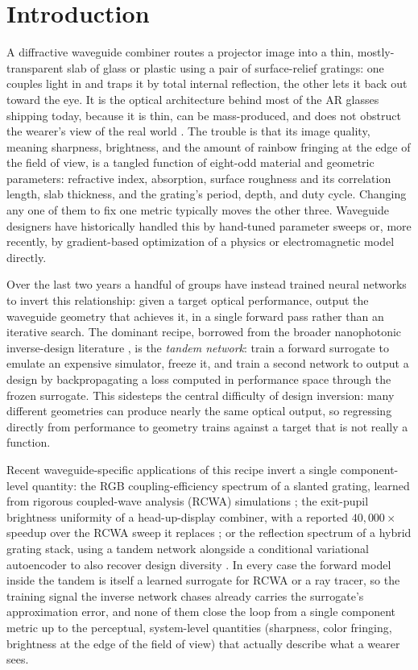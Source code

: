 \documentclass[10pt,twocolumn]{article}
\begin{document}
\section{Introduction}

A diffractive waveguide combiner routes a projector image into a thin,
mostly-transparent slab of glass or plastic using a pair of surface-relief
gratings: one couples light in and traps it by total internal reflection,
the other lets it back out toward the eye. It is the optical architecture
behind most of the AR glasses shipping today, because it is thin, can be
mass-produced, and does not obstruct the wearer's view of the real world
\cite{kress2021}. The trouble is that its image quality, meaning
sharpness, brightness, and the amount of rainbow fringing at the edge of
the field of view, is a tangled function of eight-odd
material and geometric parameters: refractive index, absorption, surface
roughness and its correlation length, slab thickness, and the grating's
period, depth, and duty cycle. Changing any one of them to fix one metric
typically moves the other three. Waveguide designers have historically
handled this by hand-tuned parameter sweeps or, more recently, by
gradient-based optimization of a physics or electromagnetic model directly.

Over the last two years a handful of groups have instead trained neural
networks to invert this relationship: given a target optical performance,
output the waveguide geometry that achieves it, in a single forward pass
rather than an iterative search. The dominant recipe, borrowed from the
broader nanophotonic inverse-design literature \cite{liu2018,peurifoy2018,
ma2021}, is the \emph{tandem network}: train a forward surrogate to emulate
an expensive simulator, freeze it, and train a second network to output a
design by backpropagating a loss computed in performance space through the
frozen surrogate. This sidesteps the central difficulty of design inversion:
many different geometries can produce nearly the same
optical output, so regressing directly from performance to geometry trains
against a target that is not really a function.

Recent waveguide-specific applications of this recipe invert a single
component-level quantity: the RGB coupling-efficiency spectrum of a slanted
grating, learned from rigorous coupled-wave analysis (RCWA) simulations
\cite{luo2024}; the exit-pupil brightness uniformity of a head-up-display
combiner, with a reported $40{,}000\times$ speedup over the RCWA sweep it
replaces \cite{dai2025}; or the reflection spectrum of a hybrid grating
stack, using a tandem network alongside a conditional variational
autoencoder to also recover design diversity \cite{dehghani2025}. In every case
the forward model inside the tandem is itself a learned surrogate for RCWA
or a ray tracer, so the training signal the inverse network chases already
carries the surrogate's approximation error, and none of them close the
loop from a single component metric up to the perceptual, system-level
quantities (sharpness, color fringing, brightness at the edge
of the field of view) that actually describe what a wearer
sees.
\end{document}
